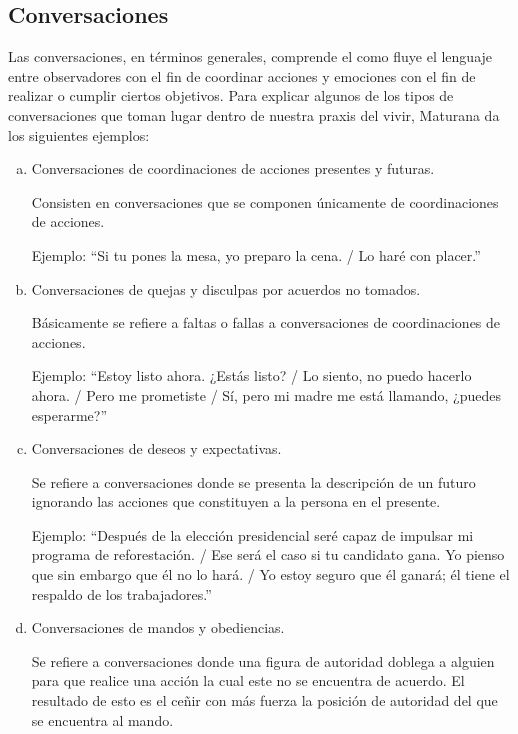 \documentclass[10pt]{article}
\begin{document}
        \subsection{Conversaciones}

        Las conversaciones, en términos generales, comprende el como fluye el lenguaje entre observadores con el fin de coordinar acciones y emociones con el fin de realizar o cumplir ciertos objetivos. Para explicar algunos de los tipos de conversaciones que toman lugar dentro de nuestra praxis del vivir, Maturana da los siguientes ejemplos:

        \begin{enumerate}[a.]
        \item Conversaciones de coordinaciones de acciones presentes y futuras.
        
        Consisten en conversaciones que se componen únicamente de coordinaciones de acciones.

        Ejemplo: ``Si tu pones la mesa, yo preparo la cena. / Lo haré con placer.''

        
        \item Conversaciones de quejas y disculpas por acuerdos no tomados.
            
        Básicamente se refiere a faltas o fallas a conversaciones de coordinaciones de acciones.
                
        Ejemplo: ``Estoy listo ahora. ¿Estás listo? / Lo siento, no puedo hacerlo ahora. / Pero me prometiste / Sí, pero mi madre me está llamando, ¿puedes esperarme?''
        
        \item Conversaciones de deseos y expectativas.
            
        Se refiere a conversaciones donde se presenta la descripción de un futuro ignorando las acciones que constituyen a la persona en el presente.

        Ejemplo: ``Después de la elección presidencial seré capaz de impulsar mi programa de reforestación. / Ese será el caso si tu candidato gana. Yo pienso que sin embargo que él no lo hará. / Yo estoy seguro que él ganará; él tiene el respaldo de los trabajadores.''
        
        \item Conversaciones de mandos y obediencias.

        Se refiere a conversaciones donde una figura de autoridad doblega a alguien para que realice una acción la cual este no se encuentra de acuerdo. El resultado de esto es el ceñir con más fuerza la posición de autoridad del que se encuentra al mando.
                

\end{enumerate}
\end{document}
